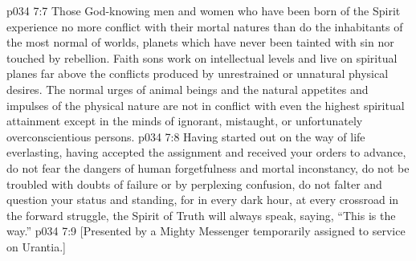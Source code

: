 \vs p034 7:7 Those God\hyp{}knowing men and women who have been born of the Spirit experience no more conflict with their mortal natures than do the inhabitants of the most normal of worlds, planets which have never been tainted with sin nor touched by rebellion. Faith sons work on intellectual levels and live on spiritual planes far above the conflicts produced by unrestrained or unnatural physical desires. The normal urges of animal beings and the natural appetites and impulses of the physical nature are not in conflict with even the highest spiritual attainment except in the minds of ignorant, mistaught, or unfortunately overconscientious persons.
\vs p034 7:8 \pc Having started out on the way of life everlasting, having accepted the assignment and received your orders to advance, do not fear the dangers of human forgetfulness and mortal inconstancy, do not be troubled with doubts of failure or by perplexing confusion, do not falter and question your status and standing, for in every dark hour, at every crossroad in the forward struggle, the Spirit of Truth will always speak, saying, “This is the way.”
\vsetoff
\vs p034 7:9 [Presented by a Mighty Messenger temporarily assigned to service on Urantia.]
\quizlink
